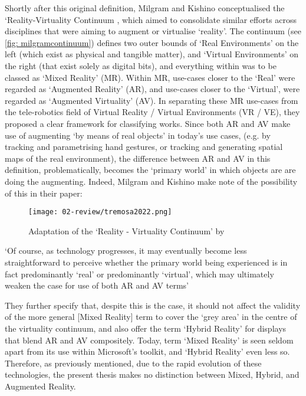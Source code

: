 Shortly after this original definition, Milgram and Kishino conceptualised the `Reality-Virtuality Continuum \citeyearpar{milgram1994}, which aimed to consolidate similar efforts across disciplines that were aiming to augment or virtualise `reality'. The continuum (see \autoref{fig: milgramcontinuum}) defines two outer bounds of `Real Environments' on the left (which exist as physical and tangible matter), and `Virtual Environments' on the right (that exist solely as digital bits), and everything within was to be classed as `Mixed Reality' (MR). Within MR, use-cases closer to the `Real' were regarded as `Augmented Reality' (AR), and use-cases closer to the `Virtual', were regarded as `Augmented Virtuality' (AV). In separating these MR use-cases from the tele-robotics field of Virtual Reality / Virtual Environments (VR / VE), they proposed a clear framework for classifying works. Since both AR and AV make use of augmenting `by means of real objects' in today's use cases, (e.g. by tracking and parametrising hand gestures, or tracking and generating spatial maps of the real environment), the difference between AR and AV in this definition, problematically, becomes the `primary world' in which objects are are doing the augmenting. Indeed, Milgram and Kishino make note of the possibility of this in their paper: 

\begin{figure}[ht]
    \centering
    \texttt{[image: 02-review/tremosa2022.png]}
    \captionsetup{justification=centering,margin=1.5cm}
    \caption{Adaptation of the `Reality - Virtuality Continuum' by \citeauthor{milgram1994} \citep[in][]{tremosa2022}}\label{fig: milgramcontinuum}
\end{figure}

`Of course, as technology progresses, it may eventually become less straightforward to perceive whether the primary world being experienced is in fact predominantly `real' or predominantly `virtual', which may ultimately weaken the case for use of both AR and AV terms'

They further specify that, despite this is the case, it should not affect the validity of the more general [Mixed Reality] term to cover the `grey area' in the centre of the virtuality continuum, and also offer the term `Hybrid Reality' for displays that blend AR and AV compositely. Today, term `Mixed Reality' is seen seldom apart from its use within Microsoft's toolkit, and `Hybrid Reality' even less so. Therefore, as previously mentioned, due to the rapid evolution of these technologies, the present thesis makes no distinction between Mixed, Hybrid, and Augmented Reality.

